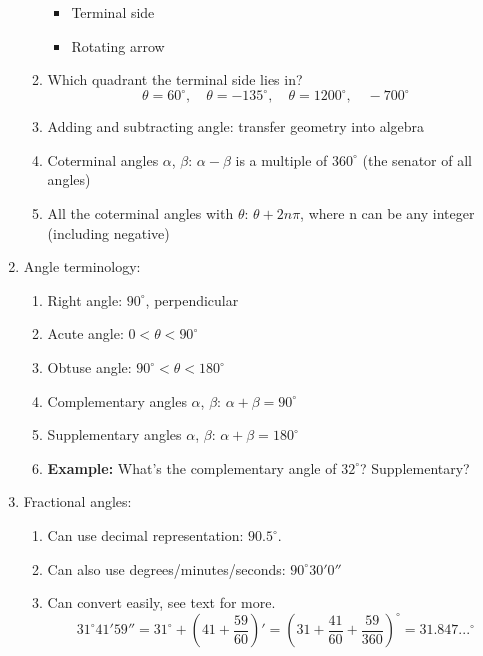 \documentclass{article}
\begin{document}
\begin{enumerate}
\begin{enumerate}
\begin{itemize}
\item Terminal side
\item Rotating arrow
\end{itemize}
\item Which quadrant the terminal side lies in?
$$
\theta = 60^\circ,\quad \theta = -135^\circ,\quad \theta = 1200^\circ, \quad -700^{\circ}
$$
\item Adding and subtracting angle: transfer geometry into algebra
\item Coterminal angles $\alpha$, $\beta$: $\alpha-\beta$ is a multiple of $360^\circ$ (the senator of all angles)
\item All the coterminal angles with $\theta$: $\theta+2n\pi$, where n can be any integer (including negative)
\end{enumerate}

\item Angle terminology:
\begin{enumerate}
\item Right angle: $90^\circ$, perpendicular
\item Acute angle: $0<\theta<90^\circ$
\item Obtuse angle: $90^\circ<\theta<180^\circ$
\item Complementary angles $\alpha$, $\beta$: $\alpha+\beta = 90^\circ$
\item Supplementary angles $\alpha$, $\beta$: $\alpha+\beta = 180^\circ$
\item {\bf Example: } What's the complementary angle of $32^\circ$? Supplementary?
\end{enumerate}

\item Fractional angles:
\begin{enumerate}
\item Can use decimal representation: $90.5^{\circ}$.
\item Can also use degrees/minutes/seconds: $90^{\circ} 30' 0''$
\item Can convert easily, see text for more.
\[
31^{\circ} 41' 59'' = 31^{\circ} + \left(41 + \frac{59}{60}\right)' = \left(31+\frac{41}{60} + \frac{59}{360}\right)^{\circ} = 31.847...^{\circ}
\]
\end{enumerate}


\end{enumerate}
\end{document}
